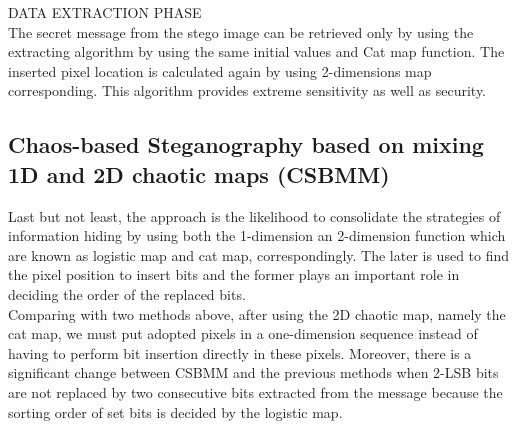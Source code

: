 \documentclass[conference]{IEEEtran}
\begin{document}
DATA EXTRACTION PHASE \\[0.2cm]
\indent The secret message from the stego image can be retrieved only by using the extracting algorithm by using the same initial values and Cat map function. The inserted pixel location is calculated again by using 2-dimensions map corresponding. This algorithm provides extreme sensitivity as well as security. 

\subsection{Chaos-based Steganography based on mixing 1D and 2D chaotic maps (CSBMM)}
\indent Last but not least, the approach is the likelihood to consolidate the strategies of information hiding by using both the 1-dimension an 2-dimension function which are known as logistic map and cat map, correspondingly. The later is used to find the pixel position to insert bits and the former plays an important role in deciding the order of the replaced bits. \\
\indent Comparing with two methods above, after using the 2D chaotic map, namely the cat map, we must put adopted pixels in a one-dimension sequence instead of having to perform bit insertion directly in these pixels. Moreover, there is a significant change between CSBMM and the previous methods when 2-LSB bits are not replaced by two consecutive bits extracted from the message because the sorting order of set bits is decided by the logistic map. 
\end{document}
